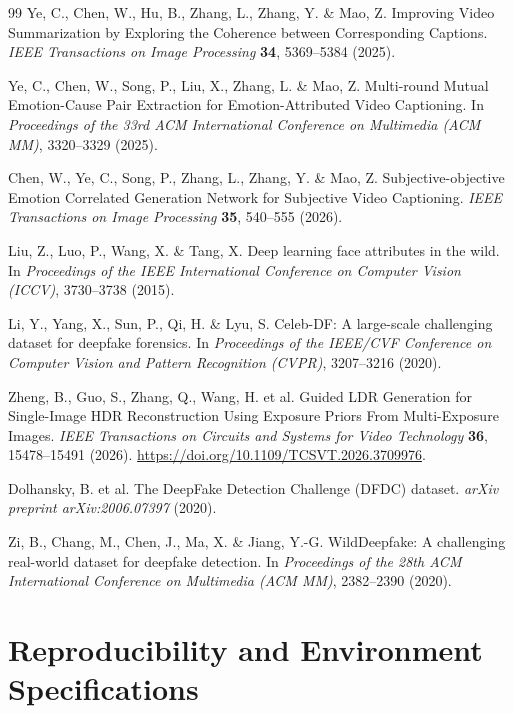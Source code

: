\documentclass[fleqn,10pt]{wlscirep}
\begin{document}
\begin{thebibliography}{99}
 Ye, C., Chen, W., Hu, B., Zhang, L., Zhang, Y. \& Mao, Z. Improving Video Summarization by Exploring the Coherence between Corresponding Captions. \textit{IEEE Transactions on Image Processing} \textbf{34}, 5369--5384 (2025).

 Ye, C., Chen, W., Song, P., Liu, X., Zhang, L. \& Mao, Z. Multi-round Mutual Emotion-Cause Pair Extraction for Emotion-Attributed Video Captioning. In \textit{Proceedings of the 33rd ACM International Conference on Multimedia (ACM MM)}, 3320--3329 (2025).

 Chen, W., Ye, C., Song, P., Zhang, L., Zhang, Y. \& Mao, Z. Subjective-objective Emotion Correlated Generation Network for Subjective Video Captioning. \textit{IEEE Transactions on Image Processing} \textbf{35}, 540--555 (2026).

 Liu, Z., Luo, P., Wang, X. \& Tang, X. Deep learning face attributes in the wild. In \textit{Proceedings of the IEEE International Conference on Computer Vision (ICCV)}, 3730--3738 (2015).

 Li, Y., Yang, X., Sun, P., Qi, H. \& Lyu, S. Celeb-DF: A large-scale challenging dataset for deepfake forensics. In \textit{Proceedings of the IEEE/CVF Conference on Computer Vision and Pattern Recognition (CVPR)}, 3207--3216 (2020).

 Zheng, B., Guo, S., Zhang, Q., Wang, H. et al. Guided LDR Generation for Single-Image HDR Reconstruction Using Exposure Priors From Multi-Exposure Images. \textit{IEEE Transactions on Circuits and Systems for Video Technology} \textbf{36}, 15478--15491 (2026). \url{https://doi.org/10.1109/TCSVT.2026.3709976}.

 Dolhansky, B. et al. The DeepFake Detection Challenge (DFDC) dataset. \textit{arXiv preprint arXiv:2006.07397} (2020).

 Zi, B., Chang, M., Chen, J., Ma, X. \& Jiang, Y.-G. WildDeepfake: A challenging real-world dataset for deepfake detection. In \textit{Proceedings of the 28th ACM International Conference on Multimedia (ACM MM)}, 2382--2390 (2020).

\end{thebibliography}

\section*{Reproducibility and Environment Specifications}
\end{document}
